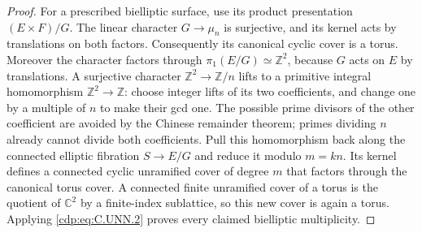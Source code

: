 \begin{proof}
For a prescribed bielliptic surface, use its
product presentation $(E\times F)/G$. The linear
character $G\to\mu_n$ is surjective, and its
kernel acts by translations on both factors.
Consequently its canonical cyclic cover is a
torus. Moreover the character factors through
$\pi_1(E/G)\simeq\mathbb Z^2$, because $G$
acts on $E$ by translations. A surjective
character $\mathbb Z^2\to\mathbb Z/n$ lifts
to a primitive integral homomorphism
$\mathbb Z^2\to\mathbb Z$: choose integer
lifts of its two coefficients, and change one
by a multiple of $n$ to make their gcd one.
The possible prime divisors of the other
coefficient are avoided by the Chinese
remainder theorem; primes dividing $n$ already
cannot divide both coefficients. Pull this
homomorphism back along the connected elliptic
fibration $S\to E/G$ and reduce it modulo
$m=kn$. Its kernel defines a connected cyclic
unramified cover of degree $m$ that factors
through the canonical torus cover. A connected
finite unramified cover of a torus is the
quotient of $\mathbb C^2$ by a finite-index
sublattice, so this new cover is again a
torus. Applying \eqref{cdp:eq:C.UNN.2} proves every claimed
bielliptic multiplicity.
\end{proof}


